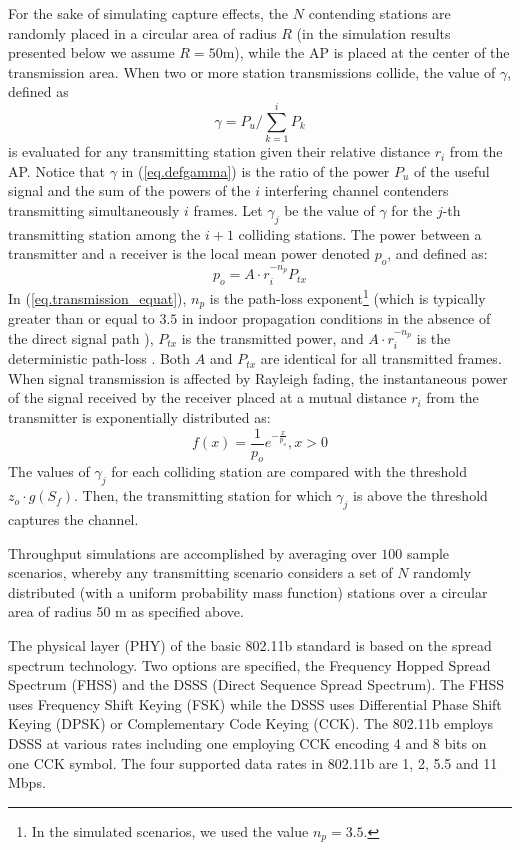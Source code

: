 \documentclass[10pt,onecolumn,a4paper]{IEEEtran}
\begin{document}
For the sake of simulating capture effects, the $N$ contending
stations are randomly placed in a circular area of radius $R$ (in
the simulation results presented below we assume $R=50$m), while
the AP is placed at the center of the transmission area. When two
or more station transmissions collide, the value of $\gamma$,
defined as
\begin{equation}\label{eq.defgamma}
\gamma=P_u/\sum_{k=1}^{i}P_k
\end{equation}
is evaluated for any transmitting station given their relative
distance $r_i$ from the AP. Notice that $\gamma$ in
(\ref{eq.defgamma}) is the ratio of the power $P_u$ of the useful
signal and the sum of the powers of the $i$ interfering channel
contenders transmitting simultaneously $i$ frames. Let $\gamma_j$
be the value of $\gamma$ for the $j$-th transmitting station among
the $i+1$ colliding stations. The power between a transmitter and
a receiver is the local mean power denoted $p_o$, and defined as:
\begin{equation}\label{eq.transmission_equat}
p_o=A\cdot r_i^{-n_p} P_{tx}
\end{equation}
In (\ref{eq.transmission_equat}), $n_p$ is the path-loss
exponent\footnote{In the simulated scenarios, we used the value
$n_p=3.5$.} (which is typically greater than or equal to $3.5$ in
indoor propagation conditions in the absence of the direct signal
path \cite{Rappaport}), $P_{tx}$ is the transmitted power, and
$A\cdot r_i^{-n_p}$ is the deterministic path-loss
\cite{Rappaport}. Both $A$ and $P_{tx}$ are identical for all
transmitted frames. When signal transmission is affected by
Rayleigh fading, the instantaneous power of the signal received by
the receiver placed at a mutual distance $r_i$ from the
transmitter is exponentially distributed as:
\[
f(x)=\frac{1}{p_o}e^{-\frac{x}{p_o}}, x>0
\]
The values of $\gamma_j$ for each colliding station are compared
with the threshold $z_o\cdot g(S_f)$. Then, the transmitting
station for which $\gamma_j$ is above the threshold captures the
channel.

Throughput simulations are accomplished by averaging over $100$
sample scenarios, whereby any transmitting scenario considers a
set of $N$ randomly distributed (with a uniform probability
mass function) stations over a circular area of radius 50 m as
specified above.

The physical layer (PHY) of the basic 802.11b standard is based on
the spread spectrum technology. Two options are specified, the
Frequency Hopped Spread Spectrum (FHSS) and the DSSS (Direct
Sequence Spread Spectrum). The FHSS uses Frequency Shift Keying
(FSK) while the DSSS uses Differential Phase Shift Keying (DPSK)
or Complementary Code Keying (CCK). The 802.11b employs DSSS at
various rates including one employing CCK encoding 4 and 8 bits on
one CCK symbol. The four supported data rates in 802.11b are 1, 2,
5.5 and 11 Mbps.
\end{document}

